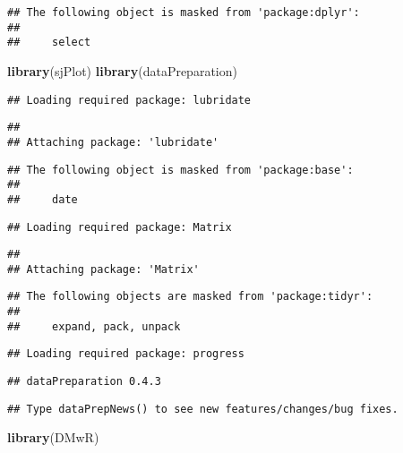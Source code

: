 \documentclass[]{article}
\newenvironment{Shaded}{\begin{snugshade}}{\end{snugshade}}
\newcommand{\KeywordTok}[1]{\textcolor[rgb]{0.13,0.29,0.53}{\textbf{#1}}}
\newcommand{\NormalTok}[1]{#1}
\begin{document}
\begin{verbatim}
## The following object is masked from 'package:dplyr':
## 
##     select
\end{verbatim}

\begin{Shaded}
\begin{Highlighting}[]
\KeywordTok{library}\NormalTok{(sjPlot)}
\KeywordTok{library}\NormalTok{(dataPreparation)}
\end{Highlighting}
\end{Shaded}

\begin{verbatim}
## Loading required package: lubridate
\end{verbatim}

\begin{verbatim}
## 
## Attaching package: 'lubridate'
\end{verbatim}

\begin{verbatim}
## The following object is masked from 'package:base':
## 
##     date
\end{verbatim}

\begin{verbatim}
## Loading required package: Matrix
\end{verbatim}

\begin{verbatim}
## 
## Attaching package: 'Matrix'
\end{verbatim}

\begin{verbatim}
## The following objects are masked from 'package:tidyr':
## 
##     expand, pack, unpack
\end{verbatim}

\begin{verbatim}
## Loading required package: progress
\end{verbatim}

\begin{verbatim}
## dataPreparation 0.4.3
\end{verbatim}

\begin{verbatim}
## Type dataPrepNews() to see new features/changes/bug fixes.
\end{verbatim}

\begin{Shaded}
\begin{Highlighting}[]
\KeywordTok{library}\NormalTok{(DMwR)}
\end{Highlighting}
\end{Shaded}
\end{document}
